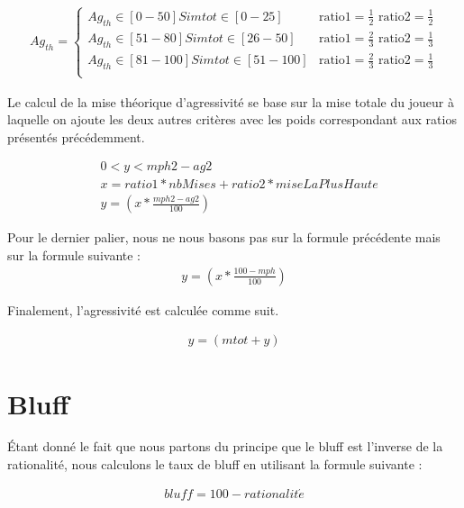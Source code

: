 \documentclass{report}
\begin{document}
\small{
\begin{align*}
	Ag_{th}=
	\begin{cases}
		Ag_{th} \in [0-50] Si mtot \in [0-25] &\text{ratio1}=\frac{1}{2} \text{ ratio2}=\frac{1}{2} \\
		Ag_{th} \in [51-80] Si mtot \in [26-50] &\text{ratio1}=\frac{2}{3} \text{ ratio2}=\frac{1}{3} \\
		Ag_{th} \in [81-100] Si mtot \in [51-100]  &\text{ratio1}=\frac{2}{3} \text{ ratio2}=\frac{1}{3}\\
	\end{cases}
\end{align*}
}


Le calcul de la mise théorique d'agressivité se base sur la mise totale du joueur à laquelle on ajoute les deux autres critères avec les poids correspondant aux ratios présentés précédemment. \par
\begin{align*}
	&0<y<mph2-ag2\\
	&x=ratio1 * nbMises + ratio2 * miseLaPlusHaute\\
	&y=\left(x*\frac{mph2-ag2}{100}\right)
\end{align*}


Pour le dernier palier, nous ne nous basons pas sur la formule précédente mais sur la formule suivante :\\ 

\begin{align*}
	y=\left(x*\frac{100-mph}{100}\right)
\end{align*}

Finalement, l'agressivité est calculée comme suit. 

\begin{align*}
	y=\left(mtot + y\right)
\end{align*}

\section{Bluff}

\hspace{0.5cm}Étant donné le fait que nous partons du principe que le bluff est l'inverse de la rationalité, nous calculons le taux de bluff en utilisant la formule suivante : \par

\begin{align*}
	bluff=100-rationalit\acute{e}
\end{align*}
\end{document}

